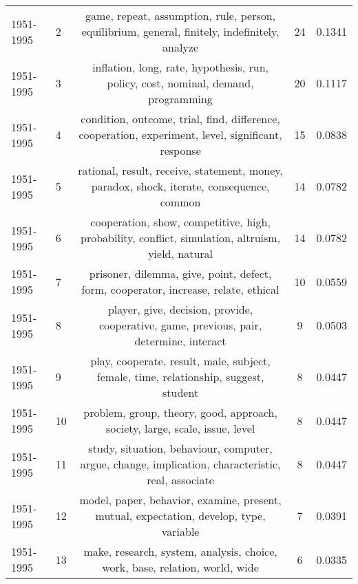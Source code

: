 \begin{tabular}{llccc}
 1951-1995 &               2 &                 game, repeat, assumption, rule, person, equilibrium, general, finitely, indefinitely, analyze &               24 &                  0.1341 \\
 1951-1995 &               3 &                            inflation, long, rate, hypothesis, run, policy, cost, nominal, demand, programming &               20 &                  0.1117 \\
 1951-1995 &               4 &            condition, outcome, trial, find, difference, cooperation, experiment, level, significant, response &               15 &                  0.0838 \\
 1951-1995 &               5 &                     rational, result, receive, statement, money, paradox, shock, iterate, consequence, common &               14 &                  0.0782 \\
 1951-1995 &               6 &             cooperation, show, competitive, high, probability, conflict, simulation, altruism, yield, natural &               14 &                  0.0782 \\
 1951-1995 &               7 &                           prisoner, dilemma, give, point, defect, form, cooperator, increase, relate, ethical &               10 &                  0.0559 \\
 1951-1995 &               8 &                       player, give, decision, provide, cooperative, game, previous, pair, determine, interact &                9 &                  0.0503 \\
 1951-1995 &               9 &                          play, cooperate, result, male, subject, female, time, relationship, suggest, student &                8 &                  0.0447 \\
 1951-1995 &              10 &                                   problem, group, theory, good, approach, society, large, scale, issue, level &                8 &                  0.0447 \\
 1951-1995 &              11 &            study, situation, behaviour, computer, argue, change, implication, characteristic, real, associate &                8 &                  0.0447 \\
 1951-1995 &              12 &                        model, paper, behavior, examine, present, mutual, expectation, develop, type, variable &                7 &                  0.0391 \\
 1951-1995 &              13 &                                   make, research, system, analysis, choice, work, base, relation, world, wide &                6 &                  0.0335 \\

\end{tabular}
